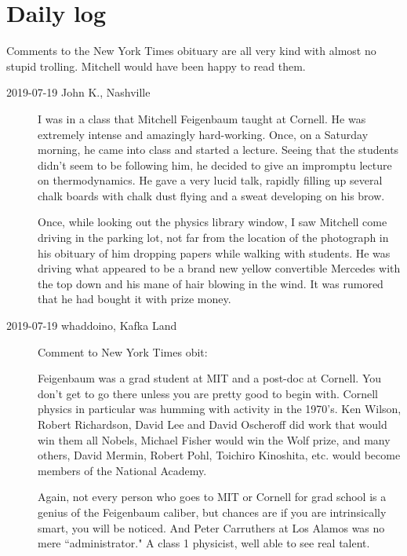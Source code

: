 

\chapter{Daily log}
\label{c-dailyBlog}

Comments to the New York Times
{obituary} are all very kind with almost no stupid trolling. Mitchell
would have been happy to read them.

\begin{description}
\item[2019-07-19 John K., Nashville]
I was in a class that Mitchell Feigenbaum taught at Cornell.  He was
extremely intense and amazingly hard-working.  Once, on a Saturday
morning, he came into class and started a lecture.  Seeing that the
students didn't seem to be following him, he decided to give an impromptu
lecture on thermodynamics.  He gave a very lucid talk, rapidly filling up
several chalk boards with chalk dust flying and a sweat developing on his
brow.

Once, while looking out the physics library window, I saw Mitchell come
driving in the parking lot, not far from the location of the photograph
in his obituary of him dropping papers while walking with students.  He
was driving what appeared to be a brand new yellow convertible Mercedes
with the top down and his mane of hair blowing in the wind.  It was
rumored that he had bought it with prize money.

\item[2019-07-19 whaddoino, Kafka Land]
Comment to New York Times obit:

Feigenbaum was a grad student at MIT and a post-doc at Cornell. You don't
get to go there unless you are pretty good to begin with. Cornell physics
in particular was humming with activity in the 1970's. Ken Wilson, Robert
Richardson, David Lee and David Oscheroff did work that would win them
all Nobels, Michael Fisher would win the Wolf prize, and many others,
David Mermin, Robert Pohl, Toichiro Kinoshita, etc. would become members
of the National Academy.

Again, not every person who goes to MIT or Cornell for grad school is a
genius of the Feigenbaum caliber, but chances are if you are
intrinsically smart, you will be noticed. And Peter Carruthers at Los
Alamos was no mere ``administrator." A class 1 physicist, well able to
see real talent.

\end{description}

